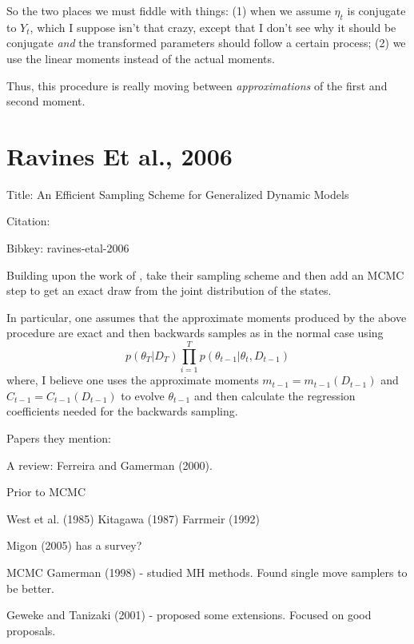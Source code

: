 \documentclass{article}
\begin{document}
\begin{outline}
So the two places we must fiddle with things: (1) when we assume $\eta_t$ is
conjugate to $Y_t$, which I suppose isn't that crazy, except that I don't see
why it should be conjugate \emph{and} the transformed parameters should follow a
certain process; (2) we use the linear moments instead of the actual moments.

Thus, this procedure is really moving between \emph{approximations} of the first
and second moment.

\end{outline}

\section{Ravines Et al., 2006}

Title: An Efficient Sampling Scheme for Generalized Dynamic Models

Citation: \cite{ravines-etal-2006}

Bibkey: ravines-etal-2006

Building upon the work of \cite{west-etal-1985}, \cite{ravines-etal-2006} take
their sampling scheme and then add an MCMC step to get an exact draw from the
joint distribution of the states.

In particular, one assumes that the approximate moments produced by the above
procedure are exact and then backwards samples as in the normal case using
\[
p(\theta_T | D_T) \prod_{i=1}^T p(\theta_{t-1} | \theta_{t}, D_{t-1})
\]
where, I believe one uses the approximate moments $m_{t-1} = m_{t-1}(D_{t-1})$
and $C_{t-1} = C_{t-1}(D_{t-1})$ to evolve $\theta_{t-1}$ and then calculate the
regression coefficients needed for the backwards sampling.

Papers they mention:

\begin{outline}

\1 A review: Ferreira and Gamerman (2000).

\1 Prior to MCMC

\2 West et al. (1985)
\2 Kitagawa (1987)
\2 Farrmeir (1992)

\1 Migon (2005) has a survey?

\1 MCMC 
\2 Gamerman (1998) - studied MH methods.  Found single move samplers to be better.

\2 Geweke and Tanizaki (2001) - proposed some extensions.  Focused on good
proposals.

\end{outline}
\end{document}

